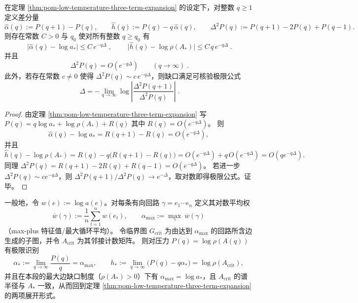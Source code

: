 \begin{theorem}\label{thm:pom-low-temperature-difference-certificates}
在定理 \ref{thm:pom-low-temperature-three-term-expansion} 的设定下，对整数 \(q\ge 1\) 定义差分量
\[
\widehat\alpha(q):=P(q+1)-P(q),\qquad
\widehat h(q):=P(q)-q\,\widehat\alpha(q),\qquad
\Delta^2P(q):=P(q+1)-2P(q)+P(q-1).
\]
则存在常数 \(C>0\) 与 \(q_0\) 使对所有整数 \(q\ge q_0\) 有
\[
\boxed{\;
\bigl|\widehat\alpha(q)-\log a_*\bigr|\le C\,e^{-q\Delta}\; },
\qquad
\boxed{\;
\bigl|\widehat h(q)-\log\rho(A_*)\bigr|\le C\,q\,e^{-q\Delta}\; }.
\]
并且
\[
\boxed{\;
\Delta^2P(q)=O(e^{-q\Delta})\qquad(q\to\infty)\; }.
\]
此外，若存在常数 \(c\neq 0\) 使得 \(\Delta^2P(q)\sim c\,e^{-q\Delta}\)，则缺口满足可核验极限公式
\[
\boxed{\;
\Delta=-\lim_{q\to\infty}\log\left|\frac{\Delta^2P(q+1)}{\Delta^2P(q)}\right|\; }.
\]
\end{theorem}
\begin{proof}
由定理 \ref{thm:pom-low-temperature-three-term-expansion} 写
\(
P(q)=q\log a_*+\log\rho(A_*)+R(q)
\)
其中 \(R(q)=O(e^{-q\Delta})\)。
则
\[
\widehat\alpha(q)-\log a_*=R(q+1)-R(q)=O(e^{-q\Delta}),
\]
并且
\[
\widehat h(q)-\log\rho(A_*)
=R(q)-q\bigl(R(q+1)-R(q)\bigr)
=O(e^{-q\Delta})+q\,O(e^{-q\Delta})
=O(qe^{-q\Delta}).
\]
同理
\(
\Delta^2P(q)=R(q+1)-2R(q)+R(q-1)=O(e^{-q\Delta})
\)。
若进一步 \(\Delta^2P(q)\sim c e^{-q\Delta}\)，则
\(
\Delta^2P(q+1)/\Delta^2P(q)\to e^{-\Delta}
\)，取对数即得极限公式。证毕。
\end{proof}

\begin{remark}\label{rem:pom-tropical-perron-binary-identification}
一般地，令 \(w(e):=\log a(e)\)。对每条有向回路 \(\gamma=e_1\cdots e_n\) 定义其对数平均权
\[
\overline{w}(\gamma):=\frac{1}{n}\sum_{t=1}^{n}w(e_t),
\qquad
\alpha_{\max}:=\max_{\gamma}\ \overline{w}(\gamma)
\]
（max-plus 特征值/最大循环平均）。
令临界图 \(G_{\mathrm{crit}}\) 为由达到 \(\alpha_{\max}\) 的回路所含边生成的子图，并令 \(A_{\mathrm{crit}}\) 为其邻接计数矩阵。
则对压力 \(P(q)=\log\rho(A(q))\) 有极限识别
\[
\alpha_\ast:=\lim_{q\to\infty}\frac{P(q)}{q}=\alpha_{\max},
\qquad
h_\ast:=\lim_{q\to\infty}\bigl(P(q)-q\alpha_\ast\bigr)=\log\rho(A_{\mathrm{crit}}),
\]
并且在本段的最大边缺口制度（\(\rho(A_*)>0\)）下有 \(\alpha_{\max}=\log a_*\)，且 \(A_{\mathrm{crit}}\) 的谱半径与 \(A_*\) 一致，从而回到定理 \ref{thm:pom-low-temperature-three-term-expansion} 的两项展开形式。
\end{remark}


